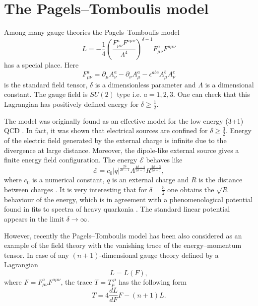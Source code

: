 \documentclass[a4 paper, 12 pt] {article}
\begin{document}
\section{\bf{The Pagels--Tomboulis model}}
Among many gauge theories the Pagels--Tomboulis model \cite{Pagels}
\begin{equation}
L= -\frac{1}{4} \left( \frac{F_{\mu \nu }^a F^{a \mu \nu
}}{\Lambda^4} \right)^{\delta-1} F_{\mu \nu }^a F^{a \mu \nu }
\label{pagels}
\end{equation}
has a special place. Here $$F_{\mu \nu }^a=\partial_{\mu } A_{\nu
}^a -\partial_{\nu } A_{\mu }^a -\epsilon^{abc} A^b_{\mu }
A^c_{\nu }$$ is the standard field tensor, $\delta $ is a
dimensionless parameter and $\Lambda $ is a dimensional constant.
The gauge field is $SU(2)$ type i.e. $a=1,2,3$. One can check that
this Lagrangian has positively defined energy for $\delta \geq
\frac{1}{2}$.
\par
The model was originally found as an effective model for the low
energy (3+1) QCD \cite{Pagels}. In fact, it was shown that
electrical sources are confined for $\delta \geq \frac{3}{2}$.
Energy of the electric field generated by the external charge is
infinite due to the divergence at large distance. Moreover, the
dipole-like external source gives a finite energy field
configuration. The energy $\mathcal{E}$ behaves like
\begin{equation}
\mathcal{E} = c_0 |q|^{\frac{2 \delta }{2\delta -1 }}
\Lambda^{\frac{4\delta -4}{2\delta -1}} R^{\frac{2\delta
-3}{2\delta -1}}, \label{energypagels}
\end{equation}
where $c_0$ is a numerical constant, $q$ is an external charge and
$R$ is the distance between charges \cite{My1}. It is very
interesting that for $\delta = \frac{5}{2}$ one obtains the
$\sqrt{R}$ behaviour of the energy, which is in agreement with a
phenomenological potential found in fits to spectra of heavy
quarkonia \cite{kacper1}. The standard linear potential appears in
the limit $\delta \rightarrow \infty $.
\par
However, recently the Pagels--Tomboulis model has been also
considered as an example of the field theory with the vanishing
trace of the energy--momentum tensor. In case of any
$(n+1)$-dimensional gauge theory defined by a Lagrangian
$$L=L(F),$$ where $F=F^a_{\mu \nu } F^{a \mu \nu }$, the trace $T
= T_{\mu}^{\; \mu}$ has the following form
\begin{equation}
T= 4 \frac{ d L}{d F} F - (n+1) L.
\label{trace}
\end{equation}
\end{document}
